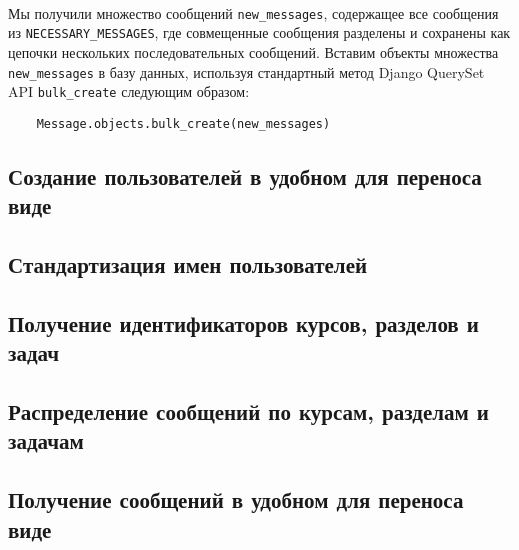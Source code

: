 \documentclass[12pt, a4paper, oneside]{article}
\begin{document}
\paragraph{}
Мы получили множество сообщений \texttt{new\_messages}, содержащее все сообщения из \texttt{NECESSARY\_MESSAGES}, где совмещенные сообщения разделены и сохранены как цепочки нескольких последовательных сообщений. Вставим объекты множества \texttt{new\_messages} в базу данных, используя стандартный метод Django QuerySet API \texttt{bulk\_create} следующим образом:
\begin{verbatim}
    Message.objects.bulk_create(new_messages)
\end{verbatim}
\vspace{1cm}

\subsection{Создание пользователей в удобном для переноса виде}
\paragraph{}

\vspace{1cm}

\subsection{Стандартизация имен пользователей}
\vspace{1cm}

\subsection{Получение идентификаторов курсов, разделов и задач}
\vspace{1cm}

\subsection{Распределение сообщений по курсам, разделам и задачам}
\vspace{1cm}

\subsection{Получение сообщений в удобном для переноса виде}
\vspace{1cm}

\newpage
\end{document}
